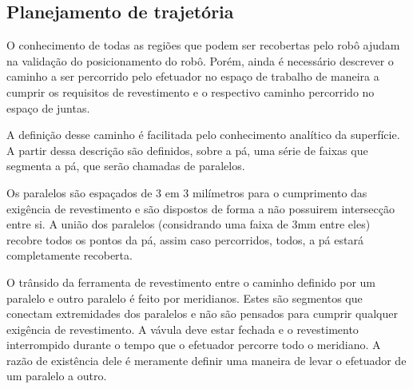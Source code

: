 \subsection{Planejamento de trajetória}

O conhecimento de todas as regiões que podem ser recobertas pelo robô ajudam na
validação do posicionamento do robô. Porém, ainda é necessário descrever o
caminho a ser percorrido pelo efetuador no espaço de trabalho de maneira a
cumprir os requisitos de revestimento e o respectivo caminho percorrido no espaço de juntas.

A definição desse caminho é facilitada pelo conhecimento analítico da
superfície. A partir dessa descrição são definidos, sobre a pá, uma série
de faixas que segmenta a pá, que serão chamadas de
paralelos.

Os paralelos são espaçados de 3 em 3 milímetros para o cumprimento das exigência
de revestimento e são dispostos de forma a não possuirem intersecção entre si. A
união dos paralelos (considrando uma faixa de 3mm entre eles) recobre todos os
pontos da pá, assim caso percorridos, todos, a pá estará completamente
recoberta.  

O trânsido da ferramenta de revestimento entre o caminho definido por um
paralelo e outro paralelo é feito por meridianos. Estes são segmentos que
conectam extremidades dos paralelos e não são pensados para cumprir qualquer
exigência de revestimento. A vávula deve estar fechada e o revestimento interrompido
durante o tempo que o efetuador percorre todo o meridiano. A razão de existência
dele é meramente definir uma maneira de levar o efetuador de um paralelo a
outro.



